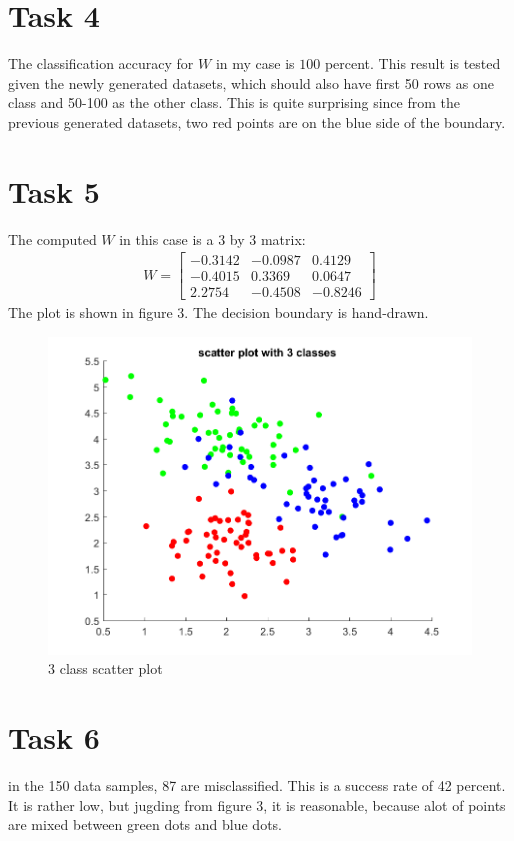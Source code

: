 \documentclass[11pt]{article}
\theoremstyle{plain}
\theoremstyle{definition}
\begin{document}
\section{Task 4}
The classification accuracy for $W$ in my case is $100$ percent. This result is tested given the newly generated datasets, which should also have first 50 rows as one class and 50-100 as the other class. This is quite surprising since from the previous generated datasets, two red points are on the blue side of the boundary. 

\section{Task 5}
The computed $W$ in this case is a 3 by 3 matrix: \begin{align*}
W =\begin{bmatrix}
-0.3142 & -0.0987 & 0.4129 \\
-0.4015 & 0.3369 & 0.0647 \\
2.2754 & -0.4508 & -0.8246
\end{bmatrix}
\end{align*}
The plot is shown in figure 3. The decision boundary is hand-drawn.
\begin{figure}
  \centering 
  \includegraphics[width= \linewidth]{Task5.png}
  \caption{3 class scatter plot}
  \label{fig:3 classes}
\end{figure}

\section{Task 6}
in the 150 data samples, 87 are misclassified. This is a success rate of 42 percent. It is rather low, but jugding from figure 3, it is reasonable, because alot of points are mixed between green dots and blue dots. 
\end{document}
